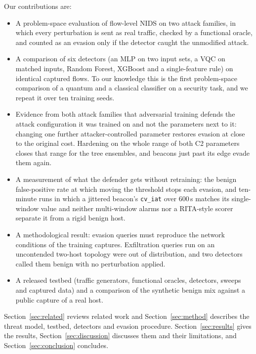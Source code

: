 \documentclass[preprint,12pt]{elsarticle}
\begin{document}
Our contributions are:
\begin{itemize}
  \item A problem-space evaluation of flow-level NIDS on two attack families, in which every
        perturbation is sent as real traffic, checked by a functional oracle, and counted as an evasion
        only if the detector caught the unmodified attack.
  \item A comparison of six detectors (an MLP on two input sets, a VQC on matched inputs, Random
        Forest, XGBoost and a single-feature rule) on identical captured flows. To our knowledge this is
        the first problem-space comparison of a quantum and a classical classifier on a security task,
        and we repeat it over ten training seeds.
  \item Evidence from both attack families that adversarial training defends the attack configuration
        it was trained on and not the parameters next to it: changing one further attacker-controlled
        parameter restores evasion at close to the original cost. Hardening on the whole range of both
        C2 parameters closes that range for the tree ensembles, and beacons just past its edge evade
        them again.
  \item A measurement of what the defender gets without retraining: the benign false-positive rate at
        which moving the threshold stops each evasion, and ten-minute runs in which a jittered
        beacon's \texttt{cv\_iat} over 600\,s matches its single-window value and neither multi-window
        alarms nor a RITA-style scorer separate it from a rigid benign host.
  \item A methodological result: evasion queries must reproduce the network conditions of the
        training captures. Exfiltration queries run on an uncontended two-host topology were out of
        distribution, and two detectors called them benign with no perturbation applied.
  \item A released testbed (traffic generators, functional oracles, detectors, sweeps and captured
        data) and a comparison of the synthetic benign mix against a public capture of a real host.
\end{itemize}

Section~\ref{sec:related} reviews related work and Section~\ref{sec:method} describes the threat model,
testbed, detectors and evasion procedure. Section~\ref{sec:results} gives the results,
Section~\ref{sec:discussion} discusses them and their limitations, and Section~\ref{sec:conclusion}
concludes.
\end{document}
